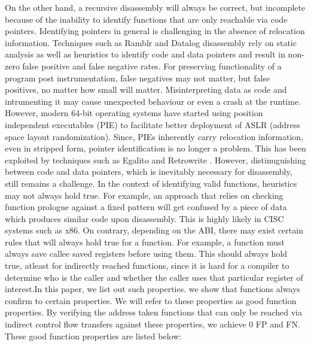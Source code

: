 On the other hand, a recursive disassembly will always be correct, but
incomplete because of the inability to identify functions that are only
reachable via code pointers.  Identifying pointers in general is challenging in
the absence of relocation information. Techniques such as Ramblr \cite {} and
Datalog disassembly rely on static analysis as well as heuristics to identify
code and data pointers and result in non-zero false positive and false negative
rates.  For preserving functionality of a program post instrumentation, false
negatives may not matter, but false positives, no matter how small will matter.
Misinterpreting data as code and intrumenting it may cause unexpected behaviour
or even a crash at the runtime. However, modern 64-bit operating systems have
started using position independent executables (PIE) to facilitate better
deployment of ASLR (address space layout randomization). Since, PIEs inherently
carry relocation information, even in stripped form, pointer identification is
no longer a problem. This has been exploited by techniques such as Egalito
\cite{} and Retrowrite \cite{}.  However, distinuguishing between code and data
pointers, which is inevitably necessary for disassembly, still remains
a challenge. In the context of identifying valid functions, heuristics may not
always hold true. For example, an approach that relies on checking function
prologue against a fixed pattern will get confused by a piece of data which
produces similar code upon disassembly. This is highly likely in CISC systems
such as x86. On contrary, depending on the ABI, there may exist certain rules
that will always hold true for a function. For example, a function must always
save callee saved registers before using them. This should always hold true,
atleast for indirectly reached functions, since it is hard for a compiler to
determine who is the caller and whether the caller uses that particular register
of interest.In this paper, we list out such properties. we show that functions
always confirm to certain properties.  We will refer to these properties as good
function properties. By verifying the address taken functions that can only be
reached via indirect control flow transfers against these properties, we achieve
0 FP and FN. These good function properties are listed below:
